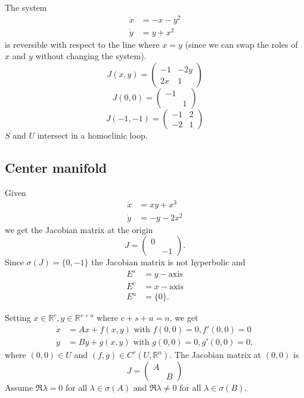 \documentclass{article}
\newcommand*{\R}{\mathbb{R}}
\newcommand*{\Rn}{{\mathbb{R}^n}}
\newcommand*{\mattwo}[4]{\begin{pmatrix}
    #1&#2\\#3&#4
\end{pmatrix}}
\newcommand*{\matdiagtwo}[2]{\mattwo{#1}{\,}{\,}{#2}}
\begin{document}
\begin{exam}
    The system
    $$\begin{aligned}
        \dot x &=-x-y^2\\
        \dot y &= y+x^2
    \end{aligned}$$
    is reversible with respect to the line where $x = y$ (since we can swap the roles of $x$ and $y$ without changing the system).
    $$J(x,y) = \mattwo{-1}{-2y}{2x}{1}$$
    $$J(0,0)=\matdiagtwo{-1}1$$
    $$J(-1,-1)=\mattwo{-1}{2}{-2}{1}$$
    $S$ and $U$ intersect in a homoclinic loop.
\end{exam}

\subsection{Center manifold}

Given
$$\begin{aligned}
    \dot x &= xy+x^3\\
    \dot y &= -y-2x^2
\end{aligned}$$
we get the Jacobian matrix at the origin
$$J = \matdiagtwo{0}{-1}.$$
Since $\sigma(J) = \{0,-1\}$ the Jacobian matrix is not hyperbolic and
$$\begin{aligned}
    E^s&= y-\text{axis}\\
    E^c&= x-\text{axis}\\
    E^u&= \{0\}.
\end{aligned}$$

Setting $x \in \R^c, y \in \R^{s+u}$ where $c+s+u=n$, we get
$$\begin{aligned}
    \dot x &= Ax+f(x,y) \text{ with } f(0,0) = 0, f'(0,0)=0\\
    \dot y &= By+g(x,y) \text{ with } g(0,0) = 0, g'(0,0)=0,
\end{aligned}$$
where $(0,0) \in U$ and $(f,g)\in C^r(U,\Rn)$. The Jacobian matrix at $(0,0)$ is
$$J=\matdiagtwo{A}{B}$$
Assume $\Re \lambda = 0$ for all $\lambda \in \sigma(A)$ and $\Re \lambda \neq 0$ for all $\lambda \in \sigma(B)$.
\end{document}
